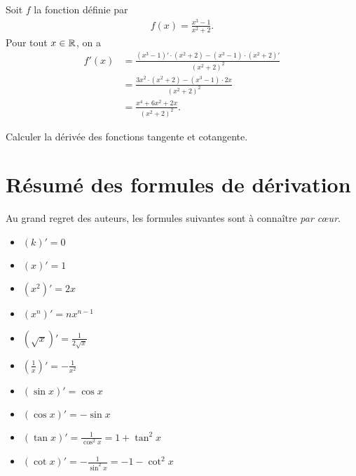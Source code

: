 \documentclass[main.tex]{subfiles}
\begin{document}
\begin{example}
    Soit $f$ la fonction définie par 
    \begin{align}
        f(x) = \frac{x^3 - 1}{x^2 + 2}.
    \end{align}
    Pour tout $x \in \mathbb{R}$, on a 
    \begin{align}
        f'(x) 
        &= \frac{(x^3 -1)' \cdot (x^2 +2) - (x^3-1) \cdot (x^2 + 2)'}{(x^2 +2)^2}\\
        &= \frac{3x^2 \cdot (x^2 + 2) - (x^3 - 1) \cdot 2x}{(x^2 + 2)^2}\\
        &= \frac{x^4 + 6 x^2 + 2x}{(x^2 + 2)^2}.
    \end{align}
\end{example}

\begin{exercise}
    Calculer la dérivée des fonctions tangente et cotangente.
\end{exercise}

\section{Résumé des formules de dérivation}

Au grand regret des auteurs, les formules suivantes sont à connaître \emph{par c\oe{}ur}.

\begin{howto}
     
     \begin{itemize}
         \item $(k)' = 0$
         \item $(x)' = 1$
         \item $(x^2)' = 2x$
         \item $(x^n)' = nx^{n-1}$
         \item $(\sqrt x)' = \frac 1 {2\sqrt x}$
         \item $\left(\frac 1 x \right)' = - \frac 1 {x^2}$
         \item $(\sin x)' = \cos x$
         \item $(\cos x)' = - \sin x$
         \item $(\tan x)' = \frac 1 {\cos^2 x} = 1 + \tan^2 x$
         \item $(\cot x)' = - \frac 1 {\sin^2 x} = -1 - \cot^2 x$
     \end{itemize}
\end{howto}
\end{document}
